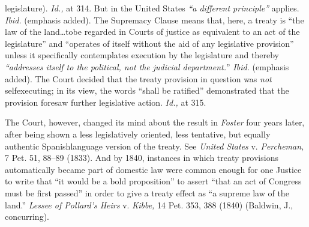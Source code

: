 legislature). \emph{Id.,} at 314. But in the United States \emph{``a
different principle''} applies. \emph{Ibid.} (emphasis added).
The Supremacy Clause means that, here, a treaty is ``the law of the
land\dots tobe regarded in Courts of justice as equivalent to an
act of the legislature'' and ``operates of itself without the aid
of any legislative provision'' unless it specifically contemplates
execution by the legislature and thereby \emph{``addresses itself to the
political, not the judicial department.}'' \emph{Ibid.} (emphasis
added). The Court decided that the treaty provision in question was
\emph{not} selfexecuting; in its view, the words ``shall be ratified''
demonstrated that the provision foresaw further legislative action.
\emph{Id.,} at 315.

  The Court, however, changed its mind about the result in \emph{Foster}
four years later, after being shown a less legislatively oriented, less
tentative, but equally authentic Spanishlanguage version of the treaty.
See \emph{United States} v. \emph{Percheman,} 7 Pet. 51, 88--89 (1833).
And by 1840, instances in which treaty provisions automatically became
part of domestic law were common enough for one Justice to write that
``it would be a bold proposition'' to assert ``that an act of
Con\newpage gress must be first passed'' in order to give a treaty effect
as ``a supreme law of the land.'' \emph{Lessee of Pollard's Heirs} v.
\emph{Kibbe,} 14 Pet. 353, 388 (1840) (Baldwin, J., concurring).

